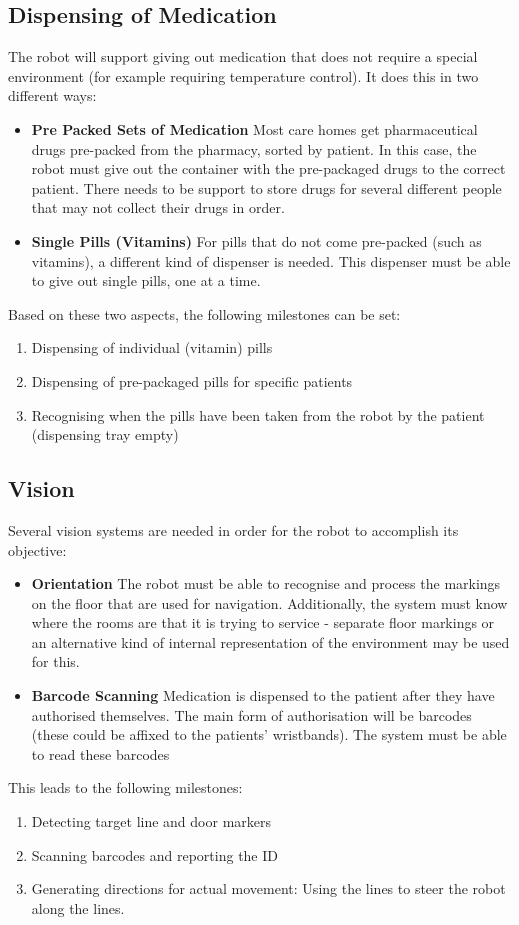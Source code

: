 \documentclass[a4paper,10pt,DIV10,openright,openbib]{scrreprt}
\begin{document}
\subsection{Dispensing of Medication}
The robot will support giving out medication that does not require a special environment
(for example requiring temperature control). It does this in two different ways:
\begin{itemize}
  \item \textbf{Pre Packed Sets of Medication} Most care homes get pharmaceutical drugs
pre-packed from the pharmacy, sorted by patient. In this case, the robot must
give out the container with the pre-packaged drugs to the correct patient. There
needs to be support to store drugs for several different people that may not
collect their drugs in order.
  \item \textbf{Single Pills (Vitamins)} For pills that do not come pre-packed
(such as vitamins), a different kind of dispenser is needed. This dispenser must
be able to give out single pills, one at a time.
\end{itemize}
Based on these two aspects, the following milestones can be set:
\begin{enumerate}
  \item Dispensing of individual (vitamin) pills
  \item Dispensing of pre-packaged pills for specific patients
  \item Recognising when the pills have been taken from the robot by the patient
    (dispensing tray empty)
\end{enumerate}

\subsection{Vision}
Several vision systems are needed in order for the robot to accomplish its objective:
\begin{itemize}
  \item \textbf{Orientation}
The robot must be able to recognise and process the markings on the floor that
are used for navigation. Additionally, the system must know where the rooms are that
it is trying to service - separate floor markings or an alternative kind of
internal representation of the environment may be used for this.
  \item \textbf{Barcode Scanning}
Medication is dispensed to the patient after they have authorised themselves.
The main form of authorisation will be barcodes (these could be affixed to the
patients' wristbands). The system must be able to read these barcodes
\end{itemize}
This leads to the following milestones:
\begin{enumerate}
  \item Detecting target line and door markers
  \item Scanning barcodes and reporting the ID
  \item Generating directions for actual movement: Using the lines to steer the
    robot along the lines.
\end{enumerate}
\end{document}
